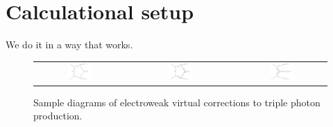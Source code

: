 \section{Calculational setup}
\label{sec:setup}

We do it in a way that works.

\begin{figure}[t!]
  \begin{tabular}{ccccc}
    \includegraphics[width=0.288\textwidth]{diagrams/aaa_V_2} & &
    \includegraphics[width=0.288\textwidth]{diagrams/aaa_V_1} & &
    \includegraphics[width=0.288\textwidth]{diagrams/aaa_V_3} \\
  \end{tabular}
  \caption{
    Sample diagrams of electroweak virtual corrections to triple 
    photon production.
  }
\end{figure}

